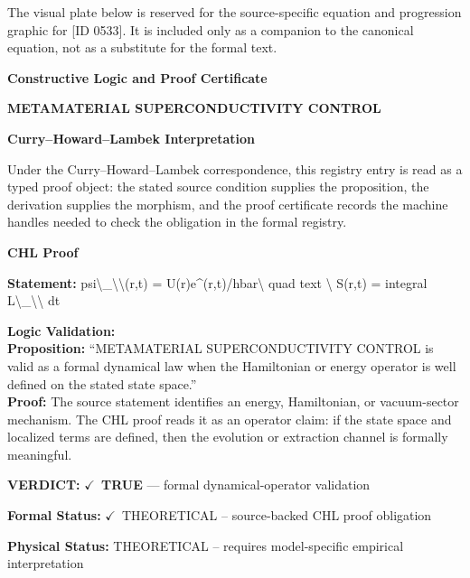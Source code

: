 \begingroup\footnotesize\sloppy
The visual plate below is reserved for the source-specific equation and progression graphic for [ID 0533]. It is included only as a companion to the canonical equation, not as a substitute for the formal text.
\par\endgroup
\ifTZPDarkEdition
{}
\fi

\clearpage
\begingroup\tzpsupportsetup
\noindent\textbf{\fontsize{10.8pt}{12.8pt}\selectfont [ID 0533] Constructive Logic and Proof Certificate}\par
\noindent\textbf{\fontsize{10pt}{12pt}\selectfont METAMATERIAL SUPERCONDUCTIVITY CONTROL}\par
\vspace{0.45em}
\begingroup
\footnotesize
\setlength{\parskip}{0.22em}
\setlength{\parindent}{0pt}
\noindent\textbf{Curry--Howard--Lambek Interpretation}\par
Under the Curry--Howard--Lambek correspondence, this registry entry is read as a typed proof
object: the stated source condition supplies the proposition, the derivation supplies the
morphism, and the proof certificate records the machine handles needed to check the obligation
in the formal registry.

\vspace{0.45em}
\noindent\textbf{CHL Proof}\par
\textbf{Statement:} psi\textbackslash{}\_\textbackslash{}\textbackslash{}(r,t) = U(r)e\textasciicircum{}(r,t)/hbar\textbackslash{} quad text \textbackslash{} S(r,t) = integral L\textbackslash{}\_\textbackslash{}\textbackslash{} dt

\textbf{Logic Validation:}\\
\textbf{Proposition:} ``METAMATERIAL SUPERCONDUCTIVITY CONTROL is valid as a formal dynamical law when the
Hamiltonian or energy operator is well defined on the stated state space.''\\
\textbf{Proof:} The source statement identifies an energy, Hamiltonian, or vacuum-sector mechanism. The
CHL proof reads it as an operator claim: if the state space and localized terms are
defined, then the evolution or extraction channel is formally meaningful.

\textbf{VERDICT:} \ensuremath{\checkmark}\ \textbf{TRUE} --- formal dynamical-operator validation

\textbf{Formal Status:} \ensuremath{\checkmark}\ THEORETICAL -- source-backed CHL proof obligation

\textbf{Physical Status:} THEORETICAL -- requires model-specific empirical interpretation
\par\vspace{0.45em}
\par
\ifTZPDarkEdition
{}
\fi
\endgroup
\endgroup
